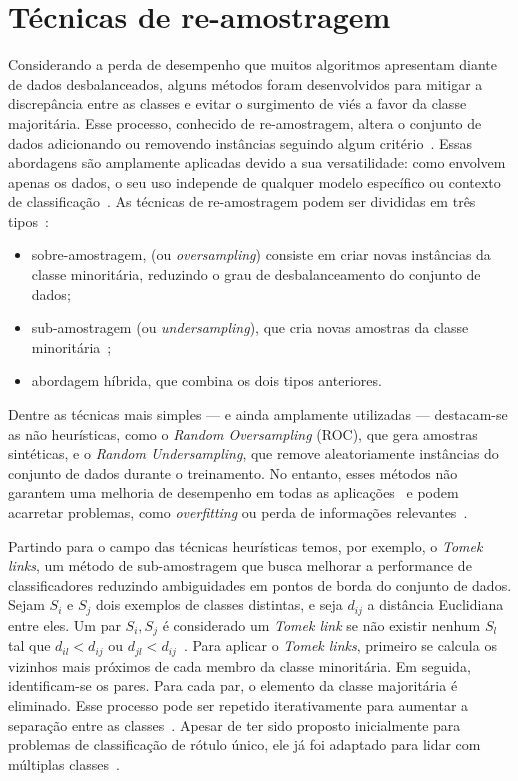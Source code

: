 \section{Técnicas de re-amostragem}

Considerando a perda de desempenho que muitos algoritmos apresentam diante de dados desbalanceados, alguns métodos foram desenvolvidos para mitigar a discrepância entre as classes e evitar o surgimento de viés a favor da classe majoritária. Esse processo, conhecido de re-amostragem, altera o conjunto de dados adicionando ou removendo instâncias seguindo algum critério~\cite{Chakravarthy2019}. Essas abordagens são amplamente aplicadas devido a sua versatilidade: como envolvem apenas os dados, o seu uso independe de qualquer modelo específico ou contexto de classificação~\cite{Carvalho2025}. As técnicas de re-amostragem podem ser divididas em três tipos~\cite{Haixiang2017}:

\begin{itemize}
  \item sobre-amostragem, (ou \textit{oversampling}) consiste em criar novas instâncias da classe minoritária, reduzindo o grau de desbalanceamento do conjunto de dados;
  \item sub-amostragem (ou \textit{undersampling}), que cria novas amostras da classe minoritária~\cite{Mohammed2020};
  \item abordagem híbrida, que combina os dois tipos anteriores.
\end{itemize}

Dentre as técnicas mais simples — e ainda amplamente utilizadas — destacam-se as não heurísticas, como o \textit{Random Oversampling} (ROC), que gera amostras sintéticas, e o \textit{Random Undersampling}, que remove aleatoriamente instâncias do conjunto de dados durante o treinamento. No entanto, esses métodos não garantem uma melhoria de desempenho em todas as aplicações~\cite{Yang2024} e podem acarretar problemas, como \textit{overfitting} ou perda de informações relevantes~\cite{Fernndez2018}.

Partindo para o campo das técnicas heurísticas temos, por exemplo, o \textit{Tomek links}, um método de sub-amostragem que busca melhorar a performance de classificadores reduzindo ambiguidades em pontos de borda do conjunto de dados. Sejam \(S_{i}\) e \(S_{j}\) dois exemplos de classes distintas, e seja \(d_{ij}\) a distância Euclidiana entre eles. Um par \(S_{i}, S_{j}\) é considerado um \textit{Tomek link} se não existir nenhum \(S_{l}\) tal que \(d_{il} < d_{ij}\) ou \(d_{jl} < d_{ij}\)~\cite{Batista2004}. Para aplicar o \textit{Tomek links}, primeiro se calcula os vizinhos mais próximos de cada membro da classe minoritária. Em seguida, identificam-se os pares. Para cada par, o elemento da classe majoritária é eliminado. Esse processo pode ser repetido iterativamente para aumentar a separação entre as classes~\cite{Arichandrapandian2024}. Apesar de ter sido proposto inicialmente para problemas de classificação de rótulo único, ele já foi adaptado para lidar com múltiplas classes~\cite{Pereira2020}.

